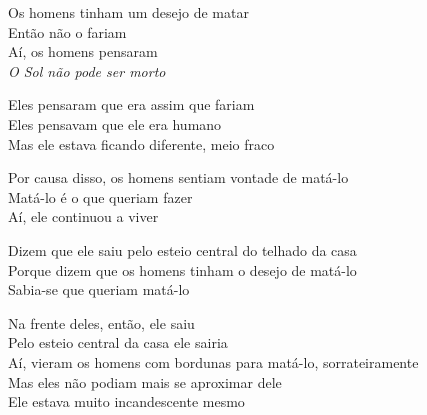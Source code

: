 \bigskip

\begin{linenumbers}
\noindent Os homens tinham um desejo de matar\\
Então não o fariam\\
Aí, os homens pensaram\\
\textit{O Sol não pode ser morto}
\end{linenumbers}

\bigskip

\begin{linenumbers}
\noindent Eles pensaram que era assim que fariam\\
Eles pensavam que ele era humano\\
Mas ele estava ficando diferente, meio fraco
\end{linenumbers}

\bigskip

\begin{linenumbers}
\noindent Por causa disso, os homens sentiam vontade de matá-lo\\
Matá-lo é o que queriam fazer\\
Aí, ele continuou a viver
\end{linenumbers}

\bigskip

\begin{linenumbers}
\noindent Dizem que ele saiu pelo esteio central do telhado da casa\\
Porque dizem que os homens tinham o desejo de matá-lo\\
Sabia-se que queriam matá-lo
\end{linenumbers}

\bigskip

\begin{linenumbers}
\noindent Na frente deles, então, ele saiu\\
Pelo esteio central da casa ele sairia\\
Aí, vieram os homens com bordunas para matá-lo, sorrateiramente\\
Mas eles não podiam mais se aproximar dele\\
Ele estava muito incandescente mesmo
\end{linenumbers}


